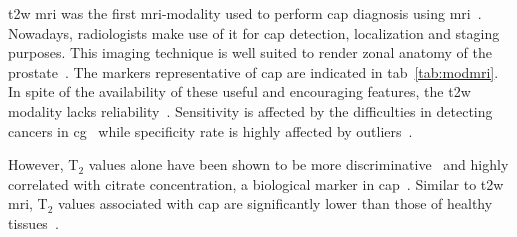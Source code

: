 \ac{t2w} \ac{mri} was the first \ac{mri}-modality used to perform \ac{cap} diagnosis using \ac{mri}~\cite{Hricak1983}. Nowadays, radiologists make use of it for \ac{cap} detection, localization and staging purposes. This imaging technique is well suited to render zonal anatomy of the prostate~\cite{Barentsz2012}. %
The markers representative of \ac{cap} are indicated in \acs{tab}~\ref{tab:modmri}. %
In spite of the availability of these useful and encouraging features, the \ac{t2w} modality lacks reliability~\cite{Kirkham2006,Hoeks2011}. Sensitivity is affected by the difficulties in detecting cancers in \ac{cg}~\cite{Kirkham2006} while specificity rate is highly affected by outliers~\cite{Hricak1987,Quint1991,Scheidler1999,Cruz2002,Barentsz2012}.

However, T$_2$ values alone have been shown to be more discriminative~\cite{Liu2011} and highly correlated with citrate concentration, a biological marker in \ac{cap}~\cite{Liney1996,Liney1997}. Similar to \ac{t2w} \ac{mri}, T$_2$ values associated with \ac{cap} are significantly lower than those of healthy tissues~\cite{Liney1996,Gibbs2001}.

